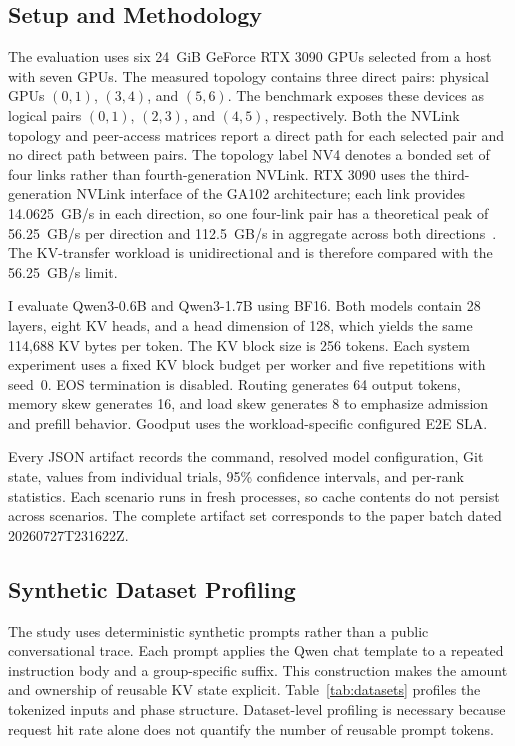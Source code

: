 \documentclass{article}
\begin{document}
\subsection{Setup and Methodology}

The evaluation uses six 24~GiB GeForce RTX 3090 GPUs selected from a host with seven GPUs. The measured topology contains three direct pairs: physical GPUs $(0,1)$, $(3,4)$, and $(5,6)$. The benchmark exposes these devices as logical pairs $(0,1)$, $(2,3)$, and $(4,5)$, respectively. Both the NVLink topology and peer-access matrices report a direct path for each selected pair and no direct path between pairs. The topology label NV4 denotes a bonded set of four links rather than fourth-generation NVLink. RTX 3090 uses the third-generation NVLink interface of the GA102 architecture; each link provides 14.0625~GB/s in each direction, so one four-link pair has a theoretical peak of 56.25~GB/s per direction and 112.5~GB/s in aggregate across both directions~\citep{NVIDIAAmpereGA102}. The KV-transfer workload is unidirectional and is therefore compared with the 56.25~GB/s limit.

I evaluate Qwen3-0.6B and Qwen3-1.7B using BF16. Both models contain 28 layers, eight KV heads, and a head dimension of 128, which yields the same 114,688 KV bytes per token. The KV block size is 256 tokens. Each system experiment uses a fixed KV block budget per worker and five repetitions with seed~0. EOS termination is disabled. Routing generates 64 output tokens, memory skew generates 16, and load skew generates 8 to emphasize admission and prefill behavior. Goodput uses the workload-specific configured E2E SLA.

Every JSON artifact records the command, resolved model configuration, Git state, values from individual trials, 95\% confidence intervals, and per-rank statistics. Each scenario runs in fresh processes, so cache contents do not persist across scenarios. The complete artifact set corresponds to the paper batch dated 20260727T231622Z.

\subsection{Synthetic Dataset Profiling}

The study uses deterministic synthetic prompts rather than a public conversational trace. Each prompt applies the Qwen chat template to a repeated instruction body and a group-specific suffix. This construction makes the amount and ownership of reusable KV state explicit. Table~\ref{tab:datasets} profiles the tokenized inputs and phase structure. Dataset-level profiling is necessary because request hit rate alone does not quantify the number of reusable prompt tokens.
\end{document}
